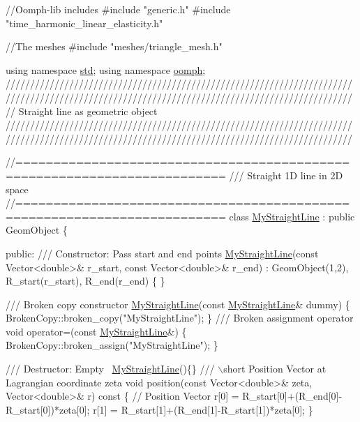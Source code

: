 \begin{DoxyCodeInclude}
\textcolor{comment}{//Oomph-lib includes}
\textcolor{preprocessor}{#include "generic.h"}
\textcolor{preprocessor}{#include "time\_harmonic\_linear\_elasticity.h"}

\textcolor{comment}{//The meshes}
\textcolor{preprocessor}{#include "meshes/triangle\_mesh.h"}

\textcolor{keyword}{using namespace }\hyperlink{namespacestd}{std};
\textcolor{keyword}{using namespace }\hyperlink{namespaceoomph}{oomph};
\textcolor{comment}{}
\textcolor{comment}{///////////////////////////////////////////////////////////////////////}
\textcolor{comment}{///////////////////////////////////////////////////////////////////////}
\textcolor{comment}{}\textcolor{comment}{// Straight line as geometric object}\textcolor{comment}{}
\textcolor{comment}{///////////////////////////////////////////////////////////////////////}
\textcolor{comment}{///////////////////////////////////////////////////////////////////////}
\textcolor{comment}{}


\textcolor{comment}{//=========================================================================}\textcolor{comment}{}
\textcolor{comment}{/// Straight 1D line in 2D space }
\textcolor{comment}{}\textcolor{comment}{//=========================================================================}
\textcolor{keyword}{class }\hyperlink{classMyStraightLine}{MyStraightLine} : \textcolor{keyword}{public} GeomObject
\{

\textcolor{keyword}{public}:
\textcolor{comment}{}
\textcolor{comment}{ /// Constructor:  Pass start and end points}
\textcolor{comment}{} \hyperlink{classMyStraightLine}{MyStraightLine}(\textcolor{keyword}{const} Vector<double>& r\_start, \textcolor{keyword}{const} Vector<double>& r\_end) 
  :  GeomObject(1,2), R\_start(r\_start), R\_end(r\_end)
  \{ \}

\textcolor{comment}{}
\textcolor{comment}{ /// Broken copy constructor}
\textcolor{comment}{} \hyperlink{classMyStraightLine}{MyStraightLine}(\textcolor{keyword}{const} \hyperlink{classMyStraightLine}{MyStraightLine}& dummy) 
  \{ 
   BrokenCopy::broken\_copy(\textcolor{stringliteral}{"MyStraightLine"});
  \} 
 \textcolor{comment}{}
\textcolor{comment}{ /// Broken assignment operator}
\textcolor{comment}{} \textcolor{keywordtype}{void} operator=(\textcolor{keyword}{const} \hyperlink{classMyStraightLine}{MyStraightLine}&) 
  \{
   BrokenCopy::broken\_assign(\textcolor{stringliteral}{"MyStraightLine"});
  \}

\textcolor{comment}{}
\textcolor{comment}{ /// Destructor:  Empty}
\textcolor{comment}{} ~\hyperlink{classMyStraightLine}{MyStraightLine}()\{\}
 \textcolor{comment}{}
\textcolor{comment}{ /// \(\backslash\)short Position Vector at Lagrangian coordinate zeta }
\textcolor{comment}{} \textcolor{keywordtype}{void} position(\textcolor{keyword}{const} Vector<double>& zeta, Vector<double>& r)\textcolor{keyword}{ const}
\textcolor{keyword}{  }\{
   \textcolor{comment}{// Position Vector}
   r[0] = R\_start[0]+(R\_end[0]-R\_start[0])*zeta[0];
   r[1] = R\_start[1]+(R\_end[1]-R\_start[1])*zeta[0];
  \}
 

\end{DoxyCodeInclude}
